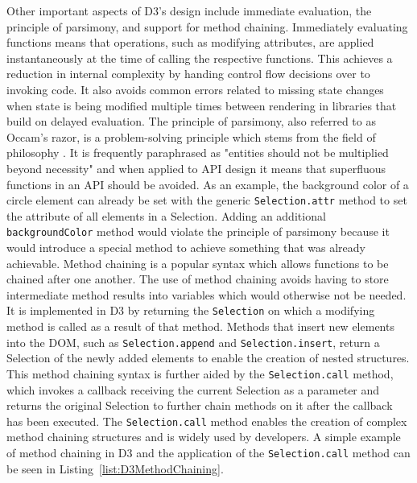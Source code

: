 Other important aspects of D3's design include immediate evaluation,
the principle of parsimony, and support for method chaining.
Immediately evaluating functions means that operations, such as
modifying attributes, are applied instantaneously at the time of
calling the respective functions.  This achieves a reduction in
internal complexity by handing control flow decisions over to invoking
code.  It also avoids common errors related to missing state changes
when state is being modified multiple times between rendering in
libraries that build on delayed evaluation.  The principle of
parsimony, also referred to as Occam's razor, is a problem-solving
principle which stems from the field of philosophy
\parencite{PrincipleOfParsimony}.  It is frequently paraphrased as
"entities should not be multiplied beyond necessity" and when applied
to API design it means that superfluous functions in an API should be
avoided.  As an example, the background color of a circle element can
already be set with the generic \lstinline{Selection.attr} method to
set the  attribute of all elements in a
Selection.  Adding an additional \lstinline{backgroundColor} method
would violate the principle of parsimony because it would introduce a
special method to achieve something that was already achievable.
Method chaining is a popular syntax which allows functions to be
chained after one another.  The use of method chaining avoids having
to store intermediate method results into variables which would
otherwise not be needed.  It is implemented in D3 by returning the
\lstinline{Selection} on which a modifying method is called as a
result of that method.  Methods that insert new elements into the DOM,
such as \lstinline{Selection.append} and \lstinline{Selection.insert},
return a Selection of the newly added elements to enable the creation
of nested structures.  This method chaining syntax is further aided by
the \lstinline{Selection.call} method, which invokes a callback
receiving the current Selection as a parameter and returns the
original Selection to further chain methods on it after the callback
has been executed.  The \lstinline{Selection.call} method enables the
creation of complex method chaining structures and is widely used by
developers.  A simple example of method chaining in D3 and the
application of the \lstinline{Selection.call} method can be seen in
Listing~\ref{list:D3MethodChaining}.


\begin{samepage}
 
    A simple example of method chaining in D3 which creates an  and  element inside a .
  },
]{listings/d3-method-chaining.js}
\end{samepage}



